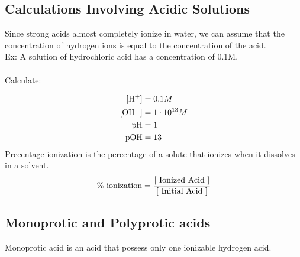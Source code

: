 \documentclass{article}
\begin{document}




 
\subsection{Calculations Involving Acidic Solutions}

Since strong acids almost completely ionize in water, we can assume that the concentration of hydrogen ions is equal to the concentration of the acid.\\

\noindent
Ex: A solution of hydrochloric acid has a concentration of 0.1M.
\\
\\Calculate:
\begin{center}
\end{center}
\begin{align*}
\ce{[H+]} &= 0.1M \\
\ce{[OH^-]} &= 1\cdot10^{13}M\\
\ce{pH} &= 1\\
\ce{pOH} &= 13\\
\end{align*}
\noindent
Precentage ionization is the percentage of a solute that ionizes when it dissolves in a solvent.\\

\begin{equation*}  
  \text{\% ionization} = \frac{\text{[ Ionized Acid ]}}{\text{[ Initial Acid ]}}\\
\end{equation*}
 
\subsection{Monoprotic and Polyprotic acids}

Monoprotic acid is an acid that possess only one ionizable hydrogen acid.\\
\end{document}
